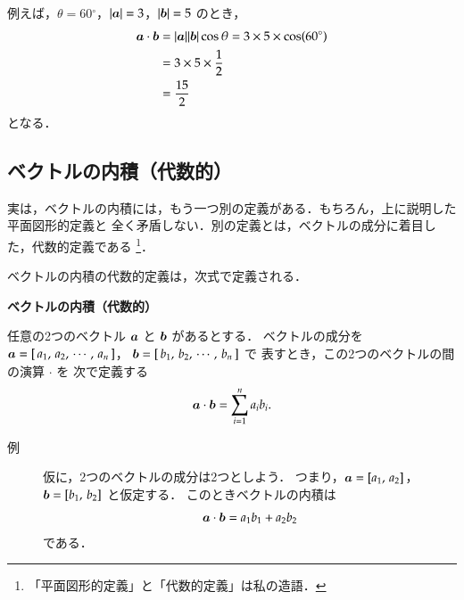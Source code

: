                 例えば，$\theta = 60{}^{\circ}$，$| \boldsymbol{a} | = 3$，$| \boldsymbol{b} | = 5$ のとき，
                    \begin{align*}
                        \boldsymbol{a}\cdot\boldsymbol{b}     &= | \boldsymbol{a} |  | \boldsymbol{b} | \cos\theta = 3 \times 5 \times \cos(60{}^{\circ}) \\
                                            &= 3 \times 5 \times \frac{1}{2} \\
                                            &= \frac{15}{2}
                    \end{align*}
                となる．
            \subsection{ベクトルの内積（代数的）}\label{subsec:VecNaisekiArg}
                実は，ベクトルの内積には，もう一つ別の定義がある．もちろん，上に説明した平面図形的定義と
                全く矛盾しない．別の定義とは，ベクトルの成分に着目した，代数的定義である
                    \footnote{
                        「平面図形的定義」と「代数的定義」は私の造語．
                    }．

                ベクトルの内積の代数的定義は，次式で定義される．
                    \\
                    \begin{itembox}[l]{\textbf{ベクトルの内積（代数的）}}
                        \begin{dfn}
                            任意の2つのベクトル $\boldsymbol{a}$ と $\boldsymbol{b}$ があるとする．
                            ベクトルの成分を
                                $\boldsymbol{a}=\left[\,a_{1},\,a_{2},\,\cdots,\,a_{n}\,\right]$，
                                $\boldsymbol{b}=\left[\,b_{1},\,b_{2},\,\cdots,\,b_{n}\,\right]$ で
                            表すとき，この2つのベクトルの間の演算 $\cdot$ を
                            次で定義する
                                \begin{align}
                                    \boldsymbol{a}\cdot\boldsymbol{b} = \sum_{i=1}^{n} a_{i}b_{i}.
                                \end{align}
                        \end{dfn}
                    \end{itembox}
                    \begin{description}
                        \item[例] 仮に，2つのベクトルの成分は2つとしよう．
                        つまり，$\boldsymbol{a}=\left[a_{1},\,a_{2}\right]$，
                                $\boldsymbol{b}=\left[b_{1},\,b_{2}\right]$ と仮定する．
                        このときベクトルの内積は
                            \begin{align}
                                \boldsymbol{a}\cdot\boldsymbol{b} = a_{1}b_{1}+a_{2}b_{2}
                            \end{align}
                        である．
                    \end{description}



